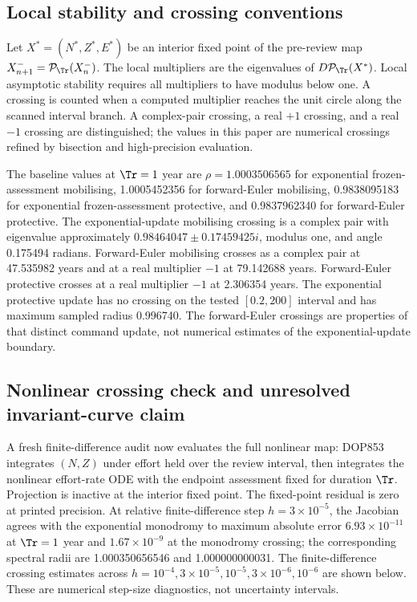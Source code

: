 \subsection{Local stability and crossing conventions}

Let \(X^*=(N^*,Z^*,E^*)\) be an interior fixed point of the pre-review map \(X^-_{n+1}=\mathcal P_{\Tr}(X^-_n)\). The local multipliers are the eigenvalues of \(D\mathcal P_{\Tr}(X^*)\). Local asymptotic stability requires all multipliers to have modulus below one. A crossing is counted when a computed multiplier reaches the unit circle along the scanned interval branch. A complex-pair crossing, a real \(+1\) crossing, and a real \(-1\) crossing are distinguished; the values in this paper are numerical crossings refined by bisection and high-precision evaluation.

The baseline values at \(\Tr=1\) year are \(\rho=1.0003506565\) for exponential frozen-assessment mobilising, 1.0005452356 for forward-Euler mobilising, 0.9838095183 for exponential frozen-assessment protective, and 0.9837962340 for forward-Euler protective. The exponential-update mobilising crossing is a complex pair with eigenvalue approximately \(0.98464047\pm0.17459425i\), modulus one, and angle 0.175494 radians. Forward-Euler mobilising crosses as a complex pair at 47.535982 years and at a real multiplier \(-1\) at 79.142688 years. Forward-Euler protective crosses at a real multiplier \(-1\) at 2.306354 years. The exponential protective update has no crossing on the tested \([0.2,200]\) interval and has maximum sampled radius 0.996740. The forward-Euler crossings are properties of that distinct command update, not numerical estimates of the exponential-update boundary.

\subsection{Nonlinear crossing check and unresolved invariant-curve claim}

A fresh finite-difference audit now evaluates the full nonlinear map: DOP853 integrates \((N,Z)\) under effort held over the review interval, then integrates the nonlinear effort-rate ODE with the endpoint assessment fixed for duration \(\Tr\). Projection is inactive at the interior fixed point. The fixed-point residual is zero at printed precision. At relative finite-difference step \(h=3\times10^{-5}\), the Jacobian agrees with the exponential monodromy to maximum absolute error \(6.93\times10^{-11}\) at \(\Tr=1\) year and \(1.67\times10^{-9}\) at the monodromy crossing; the corresponding spectral radii are 1.000350656546 and 1.000000000031. The finite-difference crossing estimates across \(h=10^{-4},3\times10^{-5},10^{-5},3\times10^{-6},10^{-6}\) are shown below. These are numerical step-size diagnostics, not uncertainty intervals.


